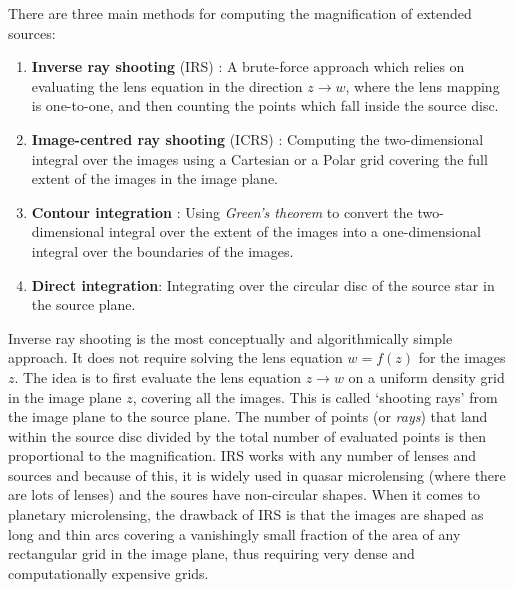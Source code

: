 \documentclass[12pt,dvipsnames]{report}
\newcommand{\ssf}[1]{\textsf{#1}}
\begin{document}
There are three main methods for computing the magnification of extended sources:
\begin{enumerate}
    \item  \textbf{Inverse ray shooting} (IRS) \citep{1986A&A...166...36K,1997MNRAS.284..172W}:
     A brute-force approach which relies on evaluating the
          lens equation in the direction $z\rightarrow w$, where the lens mapping is one-to-one,
          and then counting the points which fall inside the source disc.
    \item \textbf{Image-centred ray shooting} (ICRS) \citep{1996ApJ...472..660B,2010ApJ...716.1408B}:
        Computing the two-dimensional integral over the images using a Cartesian or a
          Polar grid covering the full extent of the images in the image plane. 
    \item  \textbf{Contour integration} \citep{1986A&A...166...36K,1995A&AS..109..597D,1997ApJ...477..580G,1998A&A...333L..79D,2007MNRAS.377.1679D}: 
    Using \emph{Green's theorem} to convert the two-dimensional integral over 
          the extent of the images into a one-dimensional integral over the boundaries of the
          images.
    \item \textbf{Direct integration}: Integrating over the circular disc of the source 
        star in the source plane.         
    \end{enumerate}
Inverse ray shooting is the most conceptually and algorithmically simple approach. 
It does not require solving the lens equation $w=f(z)$ for the images $z$. The
idea is to first evaluate the lens equation $z \rightarrow w$ on
a uniform density grid in the image plane $z$, covering all the images. This
is called `shooting rays' from the image plane to the source plane.
The number of points (or \emph{rays}) that land within the source disc
divided by the total number of evaluated points is then proportional to the
magnification. IRS works with any number of lenses and sources and
because of this, it is widely used in quasar microlensing (where there are lots of lenses)
and the soures have non-circular shapes.
When it comes to planetary microlensing, the drawback of IRS is that the images
are shaped as long and thin arcs covering a vanishingly small fraction of the area of
any rectangular grid in the image plane, thus requiring very dense and
computationally expensive grids. 

\end{document}

